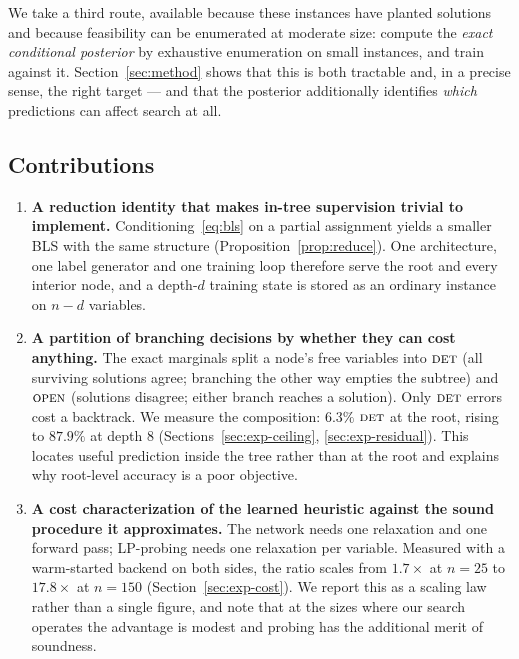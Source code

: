 \documentclass[preprint,12pt]{elsarticle}
\newcommand{\FORCED}{\textsc{det}}
\newcommand{\FREE}{\textsc{open}}
\begin{document}
We take a third route, available because these instances have planted solutions and because feasibility can be enumerated at moderate size: compute the \emph{exact conditional posterior} by exhaustive enumeration on small instances, and train against it. Section~\ref{sec:method} shows that this is both tractable and, in a precise sense, the right target --- and that the posterior additionally identifies \emph{which} predictions can affect search at all.

\subsection{Contributions}

\begin{enumerate}
\item \textbf{A reduction identity that makes in-tree supervision trivial to implement.} Conditioning~\eqref{eq:bls} on a partial assignment yields a smaller BLS with the same structure (Proposition~\ref{prop:reduce}). One architecture, one label generator and one training loop therefore serve the root and every interior node, and a depth-$d$ training state is stored as an ordinary instance on $n-d$ variables.

\item \textbf{A partition of branching decisions by whether they can cost anything.} The exact marginals split a node's free variables into $\FORCED$ (all surviving solutions agree; branching the other way empties the subtree) and $\FREE$ (solutions disagree; either branch reaches a solution). Only $\FORCED$ errors cost a backtrack. We measure the composition: $6.3\%$ $\FORCED$ at the root, rising to $87.9\%$ at depth $8$ (Sections~\ref{sec:exp-ceiling}, \ref{sec:exp-residual}). This locates useful prediction inside the tree rather than at the root and explains why root-level accuracy is a poor objective.

\item \textbf{A cost characterization of the learned heuristic against the sound procedure it approximates.} The network needs one relaxation and one forward pass; LP-probing needs one relaxation per variable. Measured with a warm-started backend on both sides, the ratio scales from $1.7\times$ at $n=25$ to $17.8\times$ at $n=150$ (Section~\ref{sec:exp-cost}). We report this as a scaling law rather than a single figure, and note that at the sizes where our search operates the advantage is modest and probing has the additional merit of soundness.


\end{enumerate}
\end{document}
